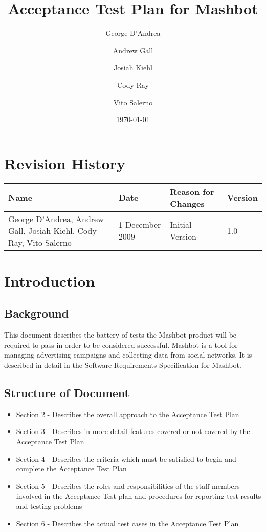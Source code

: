 \documentclass{article}
\begin{document}
\title{Acceptance Test Plan for Mashbot} 
\author{George D'Andrea \and Andrew Gall \and Josiah Kiehl \and
  Cody Ray \and Vito Salerno}
\date{\today}
\begin{titlepage}
\maketitle
\end{titlepage}

\section*{Revision History}
\begin{tabular}{|p{2in}|l|l|l|}
  \hline
  \textbf{Name} & \textbf{Date} & \textbf{Reason for Changes} & \textbf{Version} \\
  \hline \hline
  George D'Andrea, Andrew Gall, Josiah Kiehl, Cody Ray, Vito
  Salerno & 1 December 2009 & Initial Version & 1.0 \\
  \hline
\end{tabular}

\clearpage
\tableofcontents
\clearpage

\section{Introduction} %

\subsection{Background}

This document describes the battery of tests the Mashbot product will
be required to pass in order to be considered successful. Mashbot is a
tool for managing advertising campaigns and collecting data from
social networks. It is described in detail in the Software
Requirements Specification for Mashbot.

\subsection{Structure of Document}
\begin{itemize}
  \item Section 2 - Describes the overall approach to the Acceptance
    Test Plan
  \item Section 3 - Describes in more detail features covered
    or not covered by the Acceptance Test Plan
  \item Section 4 - Describes the criteria which must be satisfied to
    begin and complete the Acceptance Test Plan
  \item Section 5 - Describes the roles and responsibilities of the
    staff members involved in the Acceptance Test plan and procedures for
    reporting test results and testing problems
  \item Section 6 - Describes the actual test cases in the Acceptance
    Test Plan
\end{itemize}
\end{document}
